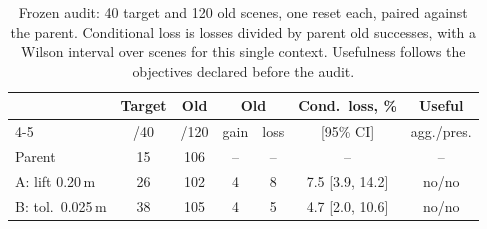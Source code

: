 \begin{table}[t]
\centering
\small
\setlength{\tabcolsep}{1.9pt}
\begin{tabular}{lcccccc}
\toprule
 & Target & Old & \multicolumn{2}{c}{Old} & Cond.\ loss, \% & Useful \\
\cmidrule(lr){4-5}
 & /40 & /120 & gain & loss & [95\% CI] & agg./pres. \\
\midrule
Parent & 15 & 106 & -- & -- & -- & -- \\
A: lift 0.20\,m & 26 & 102 & 4 & 8 & 7.5 [3.9, 14.2] & no/no \\
B: tol.\ 0.025\,m & 38 & 105 & 4 & 5 & 4.7 [2.0, 10.6] & no/no \\
\bottomrule
\end{tabular}
\caption{Frozen audit: 40 target and 120 old scenes, one reset each, paired against the parent. Conditional loss is losses divided by parent old successes, with a Wilson interval over scenes for this single context. Usefulness follows the objectives declared before the audit.}
\label{tab:audit}
\end{table}
